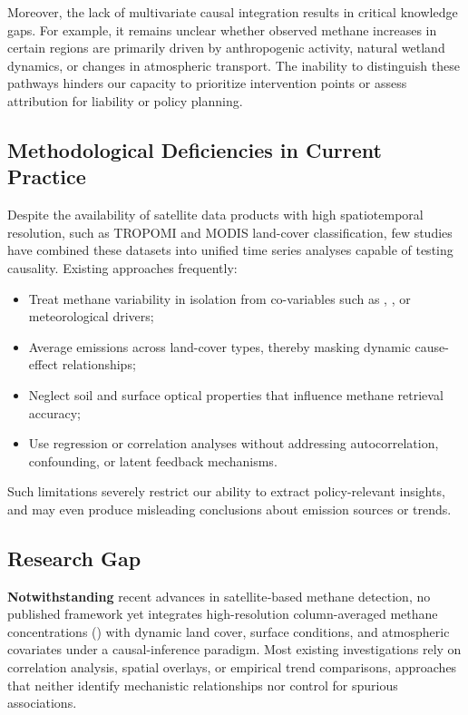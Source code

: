 Moreover, the lack of multivariate causal integration results in critical knowledge gaps. For example, it remains unclear whether observed methane increases in certain regions are primarily driven by anthropogenic activity, natural wetland dynamics, or changes in atmospheric transport. The inability to distinguish these pathways hinders our capacity to prioritize intervention points or assess attribution for liability or policy planning.

\subsection{Methodological Deficiencies in Current Practice}

Despite the availability of satellite data products with high spatiotemporal resolution, such as TROPOMI  and MODIS land-cover classification, few studies have combined these datasets into unified time series analyses capable of testing causality. Existing approaches frequently:
\begin{itemize}
    \item Treat methane variability in isolation from co-variables such as , , or meteorological drivers;
    \item Average emissions across land-cover types, thereby masking dynamic cause-effect relationships;
    \item Neglect soil and surface optical properties that influence methane retrieval accuracy;
    \item Use regression or correlation analyses without addressing autocorrelation, confounding, or latent feedback mechanisms.
\end{itemize}

Such limitations severely restrict our ability to extract policy-relevant insights, and may even produce misleading conclusions about emission sources or trends.



\subsection{Research Gap}
\label{subsec:research-gap}

\textbf{Notwithstanding} recent advances in satellite‐based methane detection, no published framework yet integrates high-resolution column-averaged methane concentrations () with dynamic land cover, surface conditions, and atmospheric covariates under a causal-inference paradigm.  Most existing investigations rely on correlation analysis, spatial overlays, or empirical trend comparisons, approaches that neither identify mechanistic relationships nor control for spurious associations.

